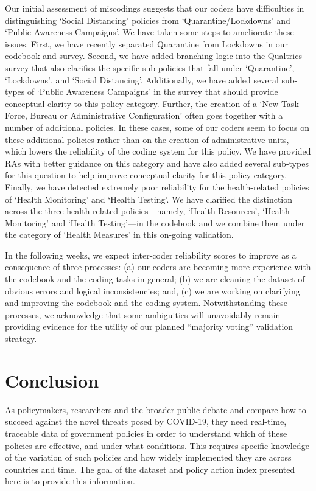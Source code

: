 \documentclass[]{article}
\begin{document}
Our initial assessment of miscodings suggests that our coders have difficulties in distinguishing `Social Distancing' policies from `Quarantine/Lockdowns' and `Public Awareness Campaigns'. We have taken some steps to ameliorate these issues. First, we have recently separated Quarantine from Lockdowns in our codebook and survey. Second, we have added branching logic into the Qualtrics survey that also clarifies the specific sub-policies that fall under `Quarantine', `Lockdowns', and `Social Distancing'. Additionally, we have added several sub-types of `Public Awareness Campaigns' in the survey that should provide conceptual clarity to this policy category. Further, the creation of a `New Task Force, Bureau or Administrative Configuration' often goes together with a number of additional policies. In these cases, some of our coders seem to focus on these additional policies rather than on the creation of administrative units, which lowers the reliability of the coding system for this policy. We have provided RAs with better guidance on this category and have also added several sub-types for this question to help improve conceptual clarity for this policy category. Finally, we have detected extremely poor reliability for the health-related policies of `Health Monitoring' and `Health Testing'. We have clarified the distinction across the three health-related policies---namely, `Health Resources', `Health Monitoring' and `Health Testing'---in the codebook and we combine them under the category of `Health Measures' in this on-going validation.

In the following weeks, we expect inter-coder reliability scores to improve as a consequence of three processes: (a) our coders are becoming more experience with the codebook and the coding tasks in general; (b) we are cleaning the dataset of obvious errors and logical inconsistencies; and, (c) we are working on clarifying and improving the codebook and the coding system. Notwithstanding these processes, we acknowledge that some ambiguities will unavoidably remain providing evidence for the utility of our planned ``majority voting'' validation strategy.

\hypertarget{conclusion}{%
\section*{Conclusion}\label{conclusion}}

As policymakers, researchers and the broader public debate and compare how to succeed against the novel threats posed by COVID-19, they need real-time, traceable data of government policies in order to understand which of these policies are effective, and under what conditions. This requires specific knowledge of the variation of such policies and how widely implemented they are across countries and time. The goal of the dataset and policy action index presented here is to provide this information.
\end{document}
